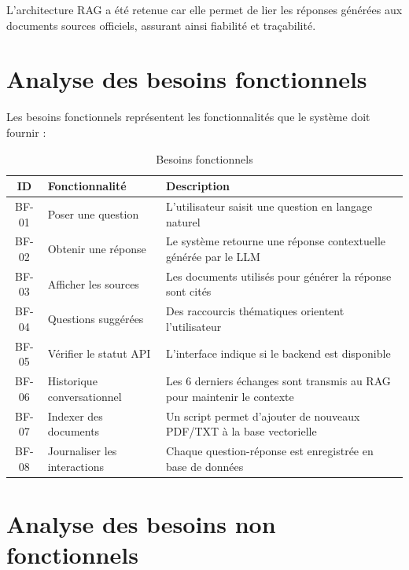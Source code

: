 \documentclass[12pt, a4paper, twoside]{report}
\begin{document}
L'architecture RAG a été retenue car elle permet de lier les réponses générées aux documents sources officiels, assurant ainsi fiabilité et traçabilité.

\section{Analyse des besoins fonctionnels}

Les besoins fonctionnels représentent les fonctionnalités que le système doit fournir :

\begin{table}[H]
\centering
\caption{Besoins fonctionnels}
\label{tab:besoins-fonctionnels}
\begin{tabularx}{\textwidth}{c l X}
\toprule
\rowcolor{primary!10}
\textbf{ID} & \textbf{Fonctionnalité} & \textbf{Description} \\
\midrule
BF-01 & Poser une question & L'utilisateur saisit une question en langage naturel \\
BF-02 & Obtenir une réponse & Le système retourne une réponse contextuelle générée par le LLM \\
BF-03 & Afficher les sources & Les documents utilisés pour générer la réponse sont cités \\
BF-04 & Questions suggérées & Des raccourcis thématiques orientent l'utilisateur \\
BF-05 & Vérifier le statut API & L'interface indique si le backend est disponible \\
BF-06 & Historique conversationnel & Les 6 derniers échanges sont transmis au RAG pour maintenir le contexte \\
BF-07 & Indexer des documents & Un script permet d'ajouter de nouveaux PDF/TXT à la base vectorielle \\
BF-08 & Journaliser les interactions & Chaque question-réponse est enregistrée en base de données \\
\bottomrule
\end{tabularx}
\end{table}

\section{Analyse des besoins non fonctionnels}
\end{document}
